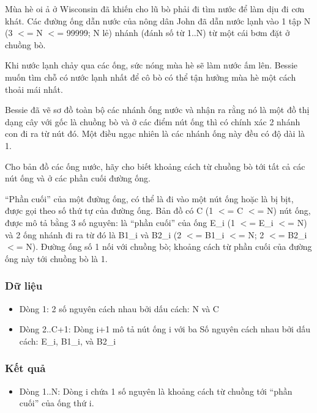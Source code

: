 



   Mùa hè oi ả ở Wisconsin đã khiến cho lũ bò phải đi tìm nước để làm dịu đi cơn khát. Các đường ống dẫn nước của nông dân John đã dẫn nước lạnh vào 1 tập N (3 $<$= N $<$= 99999; N lẻ) nhánh (đánh số từ 1..N) từ một cái bơm đặt ở chuồng bò.  

   Khi nước lạnh chảy qua các ống, sức nóng mùa hè sẽ làm nước ấm lên.  Bessie muốn tìm chỗ có nước lạnh nhất để cô bò có thể tận hưởng mùa  hè một cách thoải mái nhất.  

   Bessie đã vẽ sơ đồ toàn bộ các nhánh ống nước và nhận ra rằng nó là  một đồ thị dạng cây với gốc là chuồng bò và ở các điểm nút ống thì  có chính xác 2 nhánh con đi ra từ nút đó. Một điều ngạc nhiên là  các nhánh ống này đều có độ dài là 1.  

   Cho bản đồ các ống nước, hãy cho biết khoảng cách từ chuồng bò  tới tất cả các nút ống và ở các phần cuối đường ống.  

   “Phần cuối” của một đường ống, có thể là đi vào một nút ống hoặc  là bị bịt, được gọi theo số thứ tự của đường ống. Bản đồ có C  (1 $<$= C $<$= N) nút ống, được mô tả bằng 3 số nguyên: là “phần cuối”  của ống E\_i (1 $<$= E\_i $<$= N) và 2 ống nhánh đi ra từ đó là  B1\_i và B2\_i (2 $<$= B1\_i $<$= N; 2 $<$= B2\_i $<$= N). Đường ống số 1 nối  với chuồng bò; khoảng cách từ phần cuối của đường ống này  tới chuồng bò là 1.  

\subsubsection{   Dữ liệu  }
\begin{itemize}
	\item     Dòng 1: 2 số nguyên cách nhau bởi dấu cách: N và C   
	\item     Dòng 2..C+1: Dòng i+1 mô tả nút ống i với ba         Số nguyên cách nhau bởi dấu cách: E\_i, B1\_i, và B2\_i   
\end{itemize}

\subsubsection{   Kết quả  }
\begin{itemize}
	\item     Dòng 1..N: Dòng i chứa 1 số nguyên là khoảng            cách từ chuồng tới “phần cuối” của ống thứ i.   
\end{itemize}

